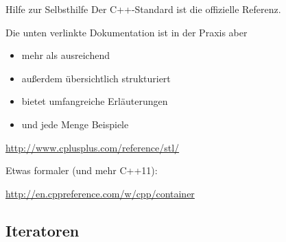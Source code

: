 \begin{frame}{Hilfe zur Selbsthilfe}
	Der C++-Standard ist die offizielle Referenz. 
	
	Die unten verlinkte Dokumentation ist in der Praxis aber
	\begin{itemize}
		\item mehr als ausreichend
		\item außerdem übersichtlich strukturiert
		\item bietet umfangreiche Erläuterungen
		\item und jede Menge Beispiele
	\end{itemize}
	
	\begin{center}
		\url{http://www.cplusplus.com/reference/stl/}
	\end{center}
	
	Etwas formaler (und mehr C++11):
	\begin{center}
		\url{http://en.cppreference.com/w/cpp/container}
	\end{center}
\end{frame}


\subsection{Iteratoren}


